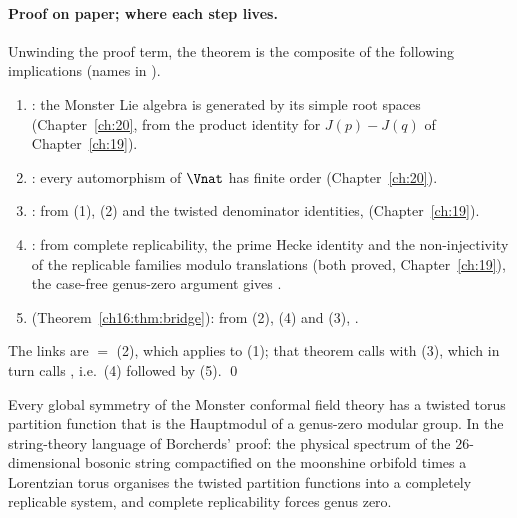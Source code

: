 \paragraph{Proof on paper; where each step lives.}  Unwinding the proof term, the theorem is the composite of the
following implications (names in ).
\begin{enumerate}[label=(\arabic*)]
\item {}: the Monster Lie algebra is generated by its simple root spaces
  (Chapter~\ref{ch:20}, from the product identity for $J(p)-J(q)$ of Chapter~\ref{ch:19}).
\item {}: every automorphism of $\Vnat$ has finite order (Chapter~\ref{ch:20}).
\item {}: from (1), (2) and the twisted denominator identities,
   (Chapter~\ref{ch:19}).
\item {}: from complete replicability, the prime Hecke identity and the
  non-injectivity of the replicable families modulo translations (both proved, Chapter~\ref{ch:19}), the case-free
  genus-zero argument gives .
\item {} (Theorem~\ref{ch16:thm:bridge}): from (2), (4) and (3), .
\end{enumerate}
The links are  $=$  (2), which applies
 to (1); that theorem calls
 with (3), which in turn calls
, i.e.\ (4) followed by (5). \qed
\begin{physics}
Every global symmetry of the Monster conformal field theory has a twisted torus partition function that is the
Hauptmodul of a genus-zero modular group.  In the string-theory language of Borcherds' proof: the physical spectrum of
the $26$-dimensional bosonic string compactified on the moonshine orbifold times a Lorentzian torus organises the
twisted partition functions into a completely replicable system, and complete replicability forces genus zero.
\end{physics}
